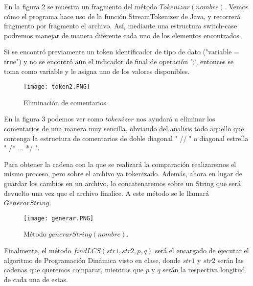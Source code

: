 \documentclass[12pt,twoside]{article}
\begin{document}
\newpage

En la figura 2 se muestra un fragmento del m\'etodo $Tokenizar(nombre)$. Vemos c\'omo el programa hace uso de la funci\'on StreamTokenizer de Java, y recorrer\'a  fragmento por fragmento el archivo. As\'i, mediante una estructura switch-case podremos manejar de manera diferente cada uno de los elementos encontrados. 

\vspace{5mm} %

Si se encontr\'o previamente un token identificador de tipo de dato ("variable = true") y no se encontr\'o a\'un el indicador de final de operaci\'on ';', entonces se toma como variable y le asigna uno de los valores disponibles. 

\vspace{0cm}

\begin{figure}[htb]
\centering
\texttt{[image: token2.PNG]}
\caption{Eliminaci\'on de comentarios.}
\end{figure}

\vspace{0cm}

En la figura 3 podemos ver como $tokenizer$ nos ayudar\'a a eliminar los comentarios de una manera muy sencilla, obviando del analisis todo aquello que contenga la estructura de comentarios de doble diagonal " // " o diagonal estrella " /* ... */ ". 

\vspace{5mm}

Para obtener la cadena con la que se realizar\'a la comparaci\'on realizaremos el mismo proceso, pero sobre el archivo ya tokenizado. Adem\'as, ahora en lugar de guardar los cambios en un archivo, lo concatenaremos sobre un String que ser\'a devuelto una vez que el archivo finalice. A este m\'etodo se le llamar\'a $GenerarString$.

\vspace{0cm}

\begin{figure}[htb]
\centering
\texttt{[image: generar.PNG]}
\caption{M\'etodo $generarString(nombre)$.}
\end{figure}

\vspace{0cm}

\newpage

Finalmente, el m\'etodo $findLCS(str1, str2, p, q)$ ser\'a el encargado de ejecutar el algoritmo de Programaci\'on Din\'amica visto en clase, donde $str1$ y $str2$ ser\'an las cadenas que queremos comparar, mientras que $p$ y $q$ ser\'an la respectiva longitud de cada una de estas. 
\end{document}
